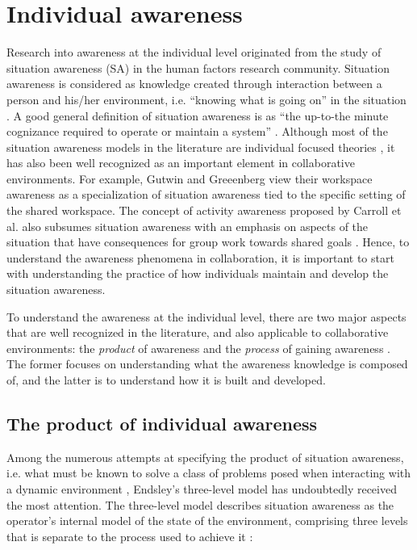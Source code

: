 \section{Individual awareness}
\label{sec:awareness_in_individuals}
Research into awareness at the individual level originated from the study of situation awareness (SA) in the human factors research community. Situation awareness is considered as knowledge created through interaction between a person and his/her environment, i.e. ``knowing what is going on'' in the situation \cite{Endsley1995}. A good general definition of situation awareness is as ``the up-to-the minute cognizance required to operate or maintain a system'' \cite{Adams1995}. Although most of the situation awareness models in the literature are individual focused theories \cite{Salmon2008}, it has also been well recognized as an important element in collaborative environments. For example, Gutwin and Greeenberg \cite{Gutwin2002} view their workspace awareness as a specialization of situation awareness tied to the specific setting of the shared workspace. The concept of activity awareness proposed by Carroll et al. also subsumes situation awareness with an emphasis on aspects of the situation that have consequences for group work towards shared goals \cite{carroll2003a}. Hence, to understand the awareness phenomena in collaboration, it is important to start with understanding the practice of how individuals maintain and develop the situation awareness.

To understand the awareness at the individual level, there are two major aspects that are well recognized in the literature, and also applicable to collaborative environments: the \emph{product} of awareness \cite{Endsley1995} and the \emph{process} of gaining awareness \cite{Adams1995}. The former focuses on understanding what the awareness knowledge is composed of, and the latter is to understand how it is built and developed.

\subsection{The product of individual awareness} %
\label{sub:awareness_as_product}
Among the numerous attempts at specifying the product of situation awareness, i.e. what must be known to solve a class of problems posed when interacting with a dynamic environment \cite{Salmon2008}, Endsley's three-level model \cite{Endsley1995} has undoubtedly received the most attention. The three-level model describes situation awareness as the operator's internal model of the state of the environment, comprising three levels that is separate to the process used to achieve it \cite{Smith1995}:

